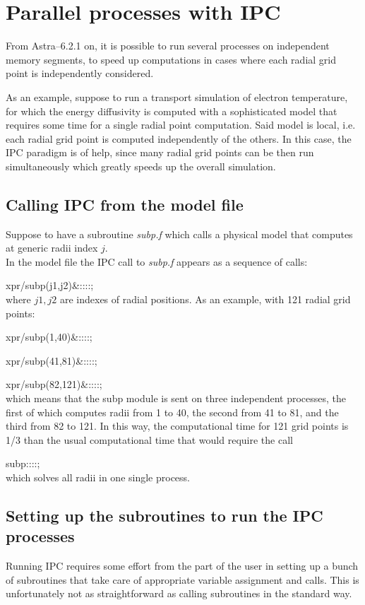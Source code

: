 
%
\section{Parallel processes with IPC}
From Astra--6.2.1 on, it is possible to run several processes on independent memory segments, to speed up computations in cases where
each radial grid point is independently considered.

As an example, suppose to run a transport simulation of electron temperature, for which the energy diffusivity is computed with a sophisticated model that requires some time for a single radial point computation.
Said model is local, i.e. each radial grid point is computed independently of the others.
In this case, the IPC paradigm is of help, since many radial grid points can be then run simultaneously which greatly speeds up the overall simulation.
%
\subsection{Calling IPC from the model file}
Suppose to have a subroutine {\it subp.f} which calls a physical model that computes at generic radii index $j$. \\
In the model file the IPC call to {\it subp.f} appears as a sequence of calls:

xpr/subp(j1,j2)\&::::;	\\
where $j1,j2$ are indexes of radial positions. As an example, with 121 radial grid points:

xpr/subp(1,40)\&::::;	

xpr/subp(41,81)\&::::;	

xpr/subp(82,121)\&::::;	\\
which means that the subp module is sent on three independent processes, the first of which computes radii from 1 to 40, the second from 41 to 81, and the third from 82 to 121. In this way, the computational time for 121 grid points is 1/3 than the usual computational time that would require the call 

subp::::;\\
which solves all radii in one single process.
%
\subsection{Setting up the subroutines to run the IPC processes}
Running IPC requires some effort from the part of the user in setting up a bunch
of subroutines that take care of appropriate variable assignment and calls. This
is unfortunately not as straightforward as calling subroutines in the standard 
way.

